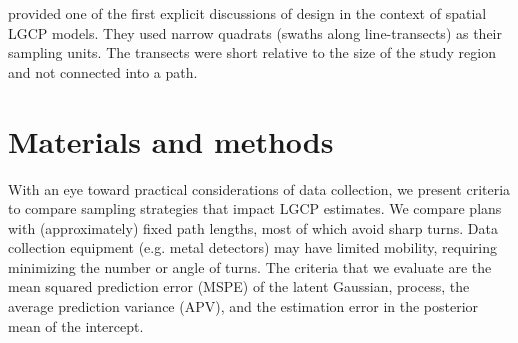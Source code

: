 \documentclass[review]{elsarticle}
\begin{document}
\citet{liuvanhatalo} provided one of the first explicit discussions of design
in the context of spatial LGCP models. They used narrow quadrats (swaths along
line-transects) as their sampling units. The transects were short relative to
the size of the study region and not connected into a path.







\section{Materials and methods}


With an eye toward practical considerations of data collection, we present
criteria to compare sampling strategies that impact LGCP estimates. We compare
plans with (approximately) fixed path lengths, most of which avoid sharp turns.
Data collection equipment (e.g. metal detectors) may have limited mobility,
requiring minimizing the number or angle of turns. The criteria that we
evaluate are the mean squared prediction error (MSPE) of the latent Gaussian,
process, the average prediction variance (APV), and the estimation error in the
posterior mean of the intercept.
\end{document}

